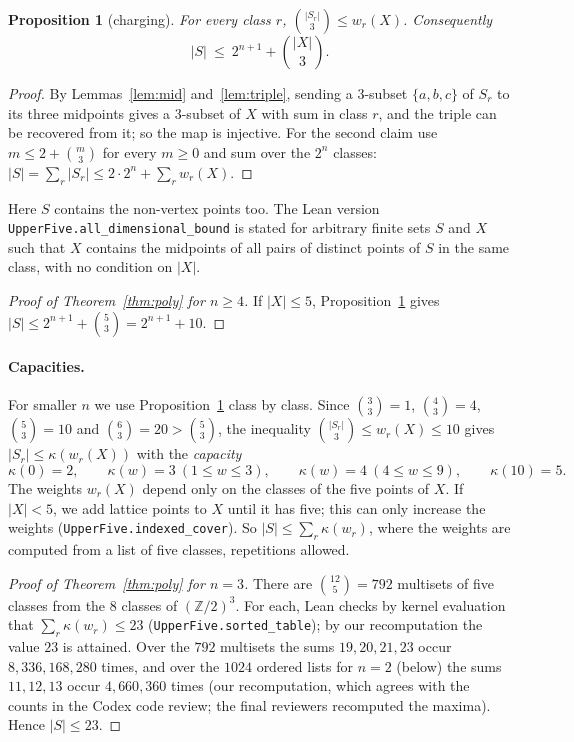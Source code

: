 \documentclass[11pt]{article}
\newtheorem{proposition}{Proposition}
\theoremstyle{definition}
\theoremstyle{remark}
\newcommand{\Z}{\mathbb Z}
\begin{document}
\begin{proposition}[charging]\label{prop:charge}
For every class $r$, $\binom{|S_r|}3\le w_r(X)$. Consequently
\[
|S|\ \le\ 2^{n+1}+\binom{|X|}{3}.
\]
\end{proposition}

\begin{proof}
By Lemmas~\ref{lem:mid} and~\ref{lem:triple}, sending a $3$-subset
$\{a,b,c\}$ of $S_r$ to its three midpoints gives a $3$-subset of $X$ with sum
in class $r$, and the triple can be recovered from it; so the map is
injective. For the second claim use $m\le2+\binom m3$ for every $m\ge0$ and sum
over the $2^n$ classes: $|S|=\sum_r|S_r|\le2\cdot2^n+\sum_rw_r(X)$.
\end{proof}

\noindent Here $S$ contains the non-vertex points too. The Lean version
\texttt{UpperFive.all\_dimensional\_bound} is stated for arbitrary
finite sets $S$ and $X$ such that $X$ contains the midpoints of all pairs of
distinct points of $S$ in the same class, with no condition on $|X|$.

\begin{proof}[Proof of Theorem~\ref{thm:poly} for $n\ge4$]
If $|X|\le5$, Proposition~\ref{prop:charge} gives
$|S|\le2^{n+1}+\binom53=2^{n+1}+10$.
\end{proof}

\paragraph{Capacities.} For smaller $n$ we use Proposition~\ref{prop:charge}
class by class. Since $\binom33=1$, $\binom43=4$, $\binom53=10$ and
$\binom63=20>\binom53$, the inequality $\binom{|S_r|}3\le w_r(X)\le10$ gives
$|S_r|\le\kappa(w_r(X))$ with the \emph{capacity}
\[
\kappa(0)=2,\qquad \kappa(w)=3\ (1\le w\le3),\qquad
\kappa(w)=4\ (4\le w\le9),\qquad \kappa(10)=5 .
\]
The weights $w_r(X)$ depend only on the classes of the five points of $X$.
If $|X|<5$, we add lattice points to $X$ until it has five; this can only
increase the weights (\texttt{UpperFive.indexed\_cover}). So
$|S|\le\sum_r\kappa(w_r)$, where the weights are computed from a list of five
classes, repetitions allowed.

\begin{proof}[Proof of Theorem~\ref{thm:poly} for $n=3$]
There are $\binom{12}5=792$ multisets of five classes from the $8$ classes of
$(\Z/2)^3$. For each, Lean checks by kernel evaluation that $\sum_r\kappa(w_r)\le23$
(\texttt{UpperFive.sorted\_table}); by our recomputation the value $23$ is
attained. Over the $792$ multisets the sums $19,20,21,23$ occur $8,336,168,280$
times, and over the $1024$ ordered lists for $n=2$ (below) the sums $11,12,13$
occur $4,660,360$ times (our recomputation, which agrees with the counts in the
Codex code review; the final reviewers recomputed the maxima). Hence
$|S|\le23$.
\end{proof}
\end{document}
